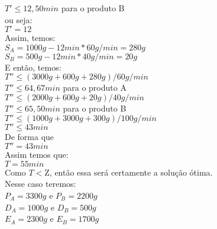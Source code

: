 \documentclass{book}
\begin{document}
$T' \leq 12,50 min$ \quad para o produto B \\

ou seja: \\

$T' = 12$ \\

Assim, temos:\\

$S_A = 1000g - 12min * 60g/min = 280g$ \\

$S_B = 500g - 12min * 40g/min = 20g$ \\

E então, temos: \\

$T'' \leq (3000g + 600g + 280g) / 60g/min$ \\

$T'' \leq 64,67 min$ \quad para o produto A \\

$T'' \leq (2000g + 600g + 20g) / 40g/min$ \\

$T'' \leq 65,50 min$ \quad para o produto B \\

$T'' \leq (1000g + 3000g + 300g) / 100g/min$ \\

$T'' \leq 43 min$ \\

De forma que \\

$T'' = 43 min$ \\

Assim temos que: \\

$ T = 55 min$ \\

Como $T<\textrm{Z}$, então essa será certamente a solução ótima. \\

Nesse caso teremos: \\

$P_A = 3300g$ e $P_B=2200g$ \\

$D_A = 1000g$ e $D_B = 500g$ \\

$E_A = 2300g$ e $E_B = 1700g$ \\

%
%




\end{document}

